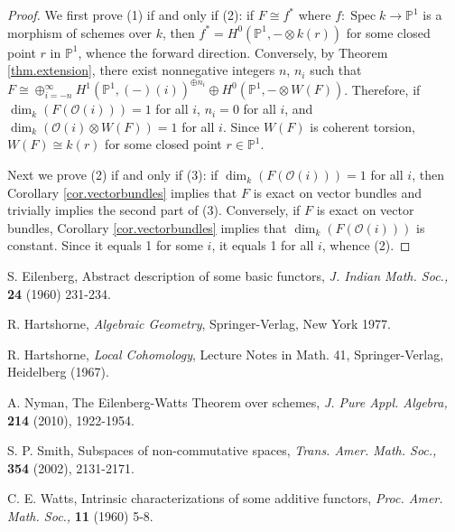 \documentclass[10pt]{amsart}
\theoremstyle{definition}
\theoremstyle{remark}
\numberwithin{equation}{section}
\begin{document}
\begin{proof}
We first prove (1) if and only if (2):  if $F \cong f^{*}$ where $f:\operatorname{Spec }k \rightarrow \mathbb{P}^{1}$ is a morphism of schemes over $k$, then $f^{*} = H^{0}(\mathbb{P}^{1},-\otimes k(r))$ for some closed point $r$ in $\mathbb{P}^{1}$, whence the forward direction.  Conversely, by Theorem \ref{thm.extension}, there exist nonnegative integers $n$, $n_{i}$ such that $F \cong \oplus_{i=-n}^\infty {H}^{1}(\mathbb{P}^{1},(-)(i))^{\oplus n_{i}} \oplus H^{0}(\mathbb{P}^{1},-\otimes W(F))$.  Therefore, if $\operatorname{dim}_{k}(F(\mathcal{O}(i)))=1$ for all $i$, $n_{i}=0$ for all $i$, and $\operatorname{dim}_{k}(\mathcal{O}(i) \otimes W(F))=1$ for all $i$.  Since $W(F)$ is coherent torsion, $W(F) \cong k(r)$ for some closed point $r \in \mathbb{P}^{1}$.

Next we prove (2) if and only if (3):  if $\operatorname{dim}_{k}(F(\mathcal{O}(i)))=1$ for all $i$, then Corollary \ref{cor.vectorbundles} implies that $F$ is exact on vector bundles and trivially implies the second part of (3).  Conversely, if $F$ is exact on vector bundles, Corollary \ref{cor.vectorbundles} implies that $\operatorname{dim}_{k}(F(\mathcal{O}(i)))$ is constant.  Since it equals 1 for some $i$, it equals 1 for all $i$, whence (2).
\end{proof}

\begin{thebibliography}{11}

S. Eilenberg, Abstract description of some basic functors,
{\it J. Indian Math. Soc.,} {\bf 24} (1960) 231-234.

R. Hartshorne, {\it Algebraic Geometry}, Springer-Verlag, New York
1977.

R. Hartshorne, {\it Local Cohomology}, Lecture Notes in Math. 41, Springer-Verlag, Heidelberg (1967).

A. Nyman, The Eilenberg-Watts Theorem over schemes, {\it J. Pure Appl. Algebra,} {\bf 214} (2010), 1922-1954.

S. P. Smith, Subspaces of non-commutative spaces, {\it Trans. Amer. Math. Soc.,} {\bf 354} (2002), 2131-2171.

C. E. Watts, Intrinsic characterizations of some additive functors,
{\it Proc. Amer. Math. Soc.,} {\bf 11} (1960) 5-8.

\end{thebibliography}
\end{document}
